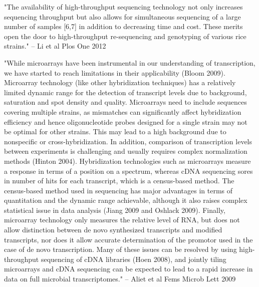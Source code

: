 \documentclass[10pt]{article}
\begin{document}
"The availability of high-throughput sequencing technology not only increases sequencing throughput but also allows for simultaneous sequencing of a large number of samples [6,7] in addition to decreasing time and cost.  These merits open the door to high-throughput re-sequencing and genotyping of various rice strains." -- Li et al Plos One 2012

"While microarrays have been instrumental in our understanding of transcription, we have started to reach limitations in their applicability (Bloom 2009).  Microarray technology (like other hybridization techniques) has a relatively limited dynamic range for the detection of transcript levels due to background, saturation and spot density and quality.  Microarrays need to include sequences covering multiple strains, as mismatches can significantly affect hybridization efficiency and hence oligonucleotide probes designed for a single strain may not be optimal for other strains.  This may lead to a high background due to nonspecific or cross-hybridization.  In addition, comparison of transcription levels between experiments is challenging and usually requires complex normalization methods (Hinton 2004).  Hybridization technologies such as microarrays measure a response in terms of a position on a spectrum, whereas cDNA sequencing sores in number of hits for each transcript, which is a census-based method.  The census-based method used in sequencing has major advantages in terms of quantitation and the dynamic range achievable, although it also raises complex statistical issue in data analysis (Jiang 2009 and Oshlack 2009).  Finally, microarray technology only measures the relative level of RNA, but does not allow distinction between de novo synthesized transcripts and modified transcripts, nor does it allow accurate determination of the promotor used in the case of de novo transcription.  Many of these issues can be resolved by using high-throughput sequencing of cDNA libraries (Hoen 2008), and jointly tiling microarrays and cDNA sequencing can be expected to lead to a rapid increase in data on full microbial transcriptomes."  -- Aliet et al Fems Microb Lett 2009
\end{document}
